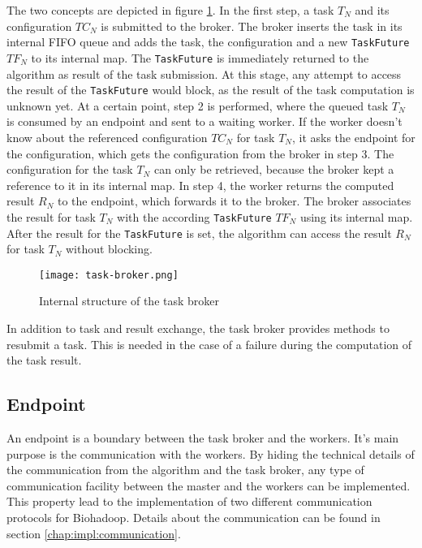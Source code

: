 The two concepts are depicted in figure \ref{fig:task-broker}. In the first step, a task $T_N$ and its configuration $TC_N$ is submitted to the broker. The broker inserts the task in its internal FIFO queue and adds the task, the configuration and a new \texttt{TaskFuture} $TF_N$ to its internal map. The \texttt{TaskFuture} is immediately returned to the algorithm as result of the task submission. At this stage, any attempt to access the result of the \texttt{TaskFuture} would block, as the result of the task computation is unknown yet. At a certain point, step 2 is performed, where the queued task $T_N$ is consumed by an endpoint and sent to a waiting worker. If the worker doesn't know about the referenced configuration $TC_N$ for task $T_N$, it asks the endpoint for the configuration, which gets the configuration from the broker in step 3. The configuration for the task $T_N$ can only be retrieved, because the broker kept a reference to it in its internal map. In step 4, the worker returns the computed result $R_N$ to the endpoint, which forwards it to the broker. The broker associates the result for task $T_N$ with the according \texttt{TaskFuture} $TF_N$ using its internal map. After the result for the \texttt{TaskFuture} is set, the algorithm can access the result $R_N$ for task $T_N$ without blocking.

\begin{figure}
  \centering
  \texttt{[image: task-broker.png]}
  \caption[Internal structure of the task broker]{Internal structure of the task broker}
  \label{fig:task-broker}
\end{figure}

In addition to task and result exchange, the task broker provides methods to resubmit a task. This is needed in the case of a failure during the computation of the task result.

\subsection{Endpoint}
\label{chap:impl:endpoint}
An endpoint is a boundary between the task broker and the workers. It's main purpose is the communication with the workers. By hiding the technical details of the communication from the algorithm and the task broker, any type of communication facility between the master and the workers can be implemented. This property lead to the implementation of two different communication protocols for Biohadoop. Details about the communication can be found in section \ref{chap:impl:communication}.


